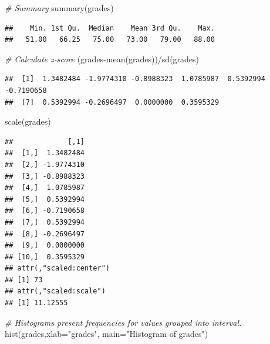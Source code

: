 \documentclass[
]{article}
\newcommand{\AttributeTok}[1]{\textcolor[rgb]{0.77,0.63,0.00}{#1}}
\newcommand{\CommentTok}[1]{\textcolor[rgb]{0.56,0.35,0.01}{\textit{#1}}}
\newcommand{\FunctionTok}[1]{\textcolor[rgb]{0.00,0.00,0.00}{#1}}
\newcommand{\NormalTok}[1]{#1}
\newcommand{\SpecialCharTok}[1]{\textcolor[rgb]{0.00,0.00,0.00}{#1}}
\newcommand{\StringTok}[1]{\textcolor[rgb]{0.31,0.60,0.02}{#1}}
\begin{document}
\begin{Highlighting}[]
\CommentTok{\# Summary}
\FunctionTok{summary}\NormalTok{(grades)}
\end{Highlighting}

\begin{verbatim}
##    Min. 1st Qu.  Median    Mean 3rd Qu.    Max. 
##   51.00   66.25   75.00   73.00   79.00   88.00
\end{verbatim}

\begin{Highlighting}[]
\CommentTok{\# Calculate z{-}score}
\NormalTok{(grades}\SpecialCharTok{{-}}\FunctionTok{mean}\NormalTok{(grades))}\SpecialCharTok{/}\FunctionTok{sd}\NormalTok{(grades)}
\end{Highlighting}

\begin{verbatim}
##  [1]  1.3482484 -1.9774310 -0.8988323  1.0785987  0.5392994 -0.7190658
##  [7]  0.5392994 -0.2696497  0.0000000  0.3595329
\end{verbatim}

\begin{Highlighting}[]
\FunctionTok{scale}\NormalTok{(grades)}
\end{Highlighting}

\begin{verbatim}
##             [,1]
##  [1,]  1.3482484
##  [2,] -1.9774310
##  [3,] -0.8988323
##  [4,]  1.0785987
##  [5,]  0.5392994
##  [6,] -0.7190658
##  [7,]  0.5392994
##  [8,] -0.2696497
##  [9,]  0.0000000
## [10,]  0.3595329
## attr(,"scaled:center")
## [1] 73
## attr(,"scaled:scale")
## [1] 11.12555
\end{verbatim}

 

\begin{Highlighting}[]
\CommentTok{\#  Histograms present frequencies for values grouped into interval.}
\FunctionTok{hist}\NormalTok{(grades,}\AttributeTok{xlab=}\StringTok{"grades"}\NormalTok{, }\AttributeTok{main=}\StringTok{"Histogram of grades"}\NormalTok{)}
\end{Highlighting}
\end{document}
